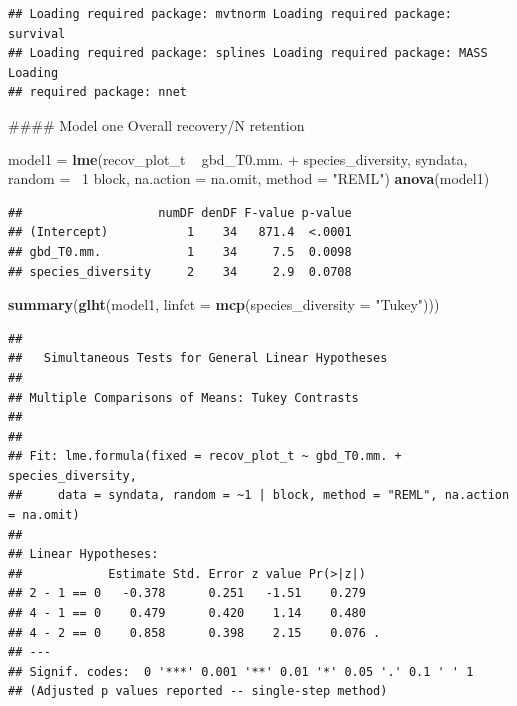 \documentclass[]{article}
\newenvironment{Shaded}{}{}
\newcommand{\KeywordTok}[1]{\textcolor[rgb]{0.00,0.44,0.13}{\textbf{{#1}}}}
\newcommand{\DataTypeTok}[1]{\textcolor[rgb]{0.56,0.13,0.00}{{#1}}}
\newcommand{\DecValTok}[1]{\textcolor[rgb]{0.25,0.63,0.44}{{#1}}}
\newcommand{\StringTok}[1]{\textcolor[rgb]{0.25,0.44,0.63}{{#1}}}
\newcommand{\NormalTok}[1]{{#1}}
\begin{document}
\begin{verbatim}
## Loading required package: mvtnorm Loading required package: survival
## Loading required package: splines Loading required package: MASS Loading
## required package: nnet
\end{verbatim}

\begin{Shaded}
\begin{Highlighting}[]
\NormalTok{#### Model one Overall recovery/N retention}

\NormalTok{model1 = }\KeywordTok{lme}\NormalTok{(recov_plot_t ~ gbd_T0.mm. + species_diversity, syndata, }\DataTypeTok{random =} \NormalTok{~}\DecValTok{1} \NormalTok{\textbar{} }
    \NormalTok{block, }\DataTypeTok{na.action =} \NormalTok{na.omit, }\DataTypeTok{method =} \StringTok{"REML"}\NormalTok{)}
\KeywordTok{anova}\NormalTok{(model1)}
\end{Highlighting}
\end{Shaded}

\begin{verbatim}
##                   numDF denDF F-value p-value
## (Intercept)           1    34   871.4  <.0001
## gbd_T0.mm.            1    34     7.5  0.0098
## species_diversity     2    34     2.9  0.0708
\end{verbatim}

\begin{Shaded}
\begin{Highlighting}[]
\KeywordTok{summary}\NormalTok{(}\KeywordTok{glht}\NormalTok{(model1, }\DataTypeTok{linfct =} \KeywordTok{mcp}\NormalTok{(}\DataTypeTok{species_diversity =} \StringTok{"Tukey"}\NormalTok{)))}
\end{Highlighting}
\end{Shaded}

\begin{verbatim}
## 
##   Simultaneous Tests for General Linear Hypotheses
## 
## Multiple Comparisons of Means: Tukey Contrasts
## 
## 
## Fit: lme.formula(fixed = recov_plot_t ~ gbd_T0.mm. + species_diversity, 
##     data = syndata, random = ~1 | block, method = "REML", na.action = na.omit)
## 
## Linear Hypotheses:
##            Estimate Std. Error z value Pr(>|z|)  
## 2 - 1 == 0   -0.378      0.251   -1.51    0.279  
## 4 - 1 == 0    0.479      0.420    1.14    0.480  
## 4 - 2 == 0    0.858      0.398    2.15    0.076 .
## ---
## Signif. codes:  0 '***' 0.001 '**' 0.01 '*' 0.05 '.' 0.1 ' ' 1
## (Adjusted p values reported -- single-step method)
\end{verbatim}
\end{document}
